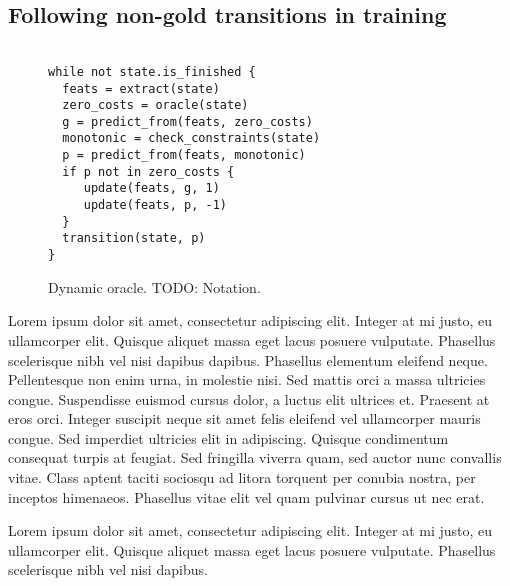 \documentclass[11pt,letterpaper]{article}
\begin{document}
\subsection{Following non-gold transitions in training}
\begin{figure}
\centering
    \begin{verbatim}

while not state.is_finished {
  feats = extract(state)
  zero_costs = oracle(state)
  g = predict_from(feats, zero_costs)
  monotonic = check_constraints(state)
  p = predict_from(feats, monotonic)
  if p not in zero_costs {
     update(feats, g, 1)
     update(feats, p, -1)
  }
  transition(state, p)
}
\end{verbatim}
\caption{Dynamic oracle. TODO: Notation.}
\end{figure}
Lorem ipsum dolor sit amet, consectetur adipiscing elit. Integer at mi justo, eu ullamcorper elit. Quisque aliquet massa eget lacus posuere vulputate. Phasellus scelerisque nibh vel nisi dapibus dapibus. Phasellus elementum eleifend neque. Pellentesque non enim urna, in molestie nisi. Sed mattis orci a massa ultricies congue. Suspendisse euismod cursus dolor, a luctus elit ultrices et. Praesent at eros orci. Integer suscipit neque sit amet felis eleifend vel ullamcorper mauris congue. Sed imperdiet ultricies elit in adipiscing. Quisque condimentum consequat turpis at feugiat. Sed fringilla viverra quam, sed auctor nunc convallis vitae. Class aptent taciti sociosqu ad litora torquent per conubia nostra, per inceptos himenaeos. Phasellus vitae elit vel quam pulvinar cursus ut nec erat.

Lorem ipsum dolor sit amet, consectetur adipiscing elit. Integer at mi justo, eu ullamcorper elit. Quisque aliquet massa eget lacus posuere vulputate. Phasellus scelerisque nibh vel nisi dapibus.
\end{document}
